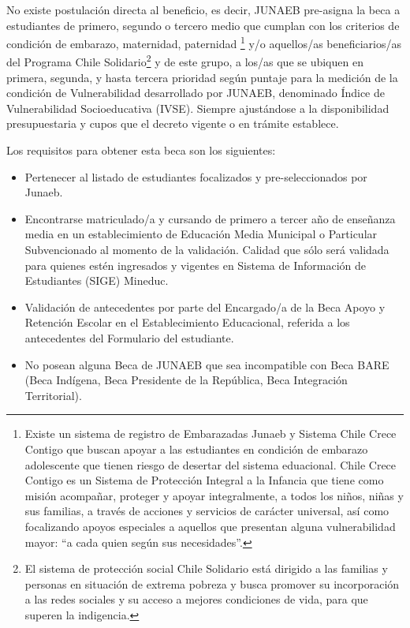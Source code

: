 No existe postulación directa al beneficio, es decir, JUNAEB pre-asigna la beca a estudiantes de primero, segundo o tercero medio que cumplan con los criterios de condición de embarazo, maternidad, paternidad \footnote{Existe un sistema de registro de Embarazadas Junaeb y Sistema Chile Crece Contigo que buscan apoyar a las estudiantes en condición de embarazo adolescente que tienen riesgo de desertar del sistema eduacional. Chile Crece Contigo es un Sistema de Protección Integral a la Infancia que tiene como misión acompañar, proteger y apoyar integralmente, a todos los niños, niñas y sus familias, a través de acciones y servicios de carácter universal, así como focalizando apoyos especiales a aquellos que presentan alguna vulnerabilidad mayor: “a cada quien según sus necesidades”.\cite{chcct}} y/o aquellos/as beneficiarios/as del Programa Chile Solidario\footnote{El sistema de protección social Chile Solidario está dirigido a las familias y personas en situación de extrema pobreza y busca promover su incorporación a las redes sociales y su acceso a mejores condiciones de vida, para que superen la indigencia.} y de este grupo, a los/as que se ubiquen en primera, segunda, y hasta tercera prioridad según puntaje para la medición de la condición de Vulnerabilidad desarrollado por JUNAEB, denominado Índice de Vulnerabilidad Socioeducativa (IVSE). Siempre ajustándose a la disponibilidad presupuestaria y cupos que el decreto vigente o en trámite establece.\cite{bare}

Los requisitos para obtener esta beca son los siguientes: 
\begin{itemize}
\item Pertenecer al listado de estudiantes focalizados y pre-seleccionados por Junaeb.
\item Encontrarse matriculado/a y cursando de primero a tercer año de enseñanza media en un establecimiento de Educación Media Municipal o Particular Subvencionado al momento de la validación. Calidad que sólo será validada para quienes estén ingresados y vigentes en Sistema de Información de Estudiantes (SIGE) Mineduc.
\item Validación de antecedentes por parte del Encargado/a de la Beca Apoyo y Retención Escolar en el Establecimiento Educacional, referida a los antecedentes del Formulario del estudiante.
\item No posean alguna Beca de JUNAEB que sea incompatible con Beca BARE (Beca Indígena, Beca Presidente de la República, Beca Integración Territorial).
\end{itemize}

